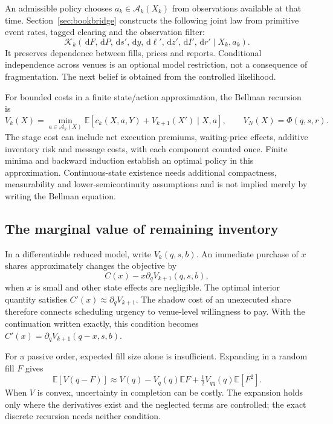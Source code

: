 \documentclass[11pt]{article}
\numberwithin{equation}{section}
\theoremstyle{definition}
\theoremstyle{remark}
\newcommand{\E}{\mathbb{E}}
\theoremstyle{definition}
\newcommand{\A}{\mathcal A}
\newcommand{\K}{\mathcal K}
\newcommand{\dd}{\,\mathrm d}
\begin{document}
An admissible policy chooses $a_k\in\A_k(X_k)$ from observations available at
that time. Section~\ref{sec:bookbridge} constructs the following joint law
from primitive event rates, tagged clearing and the observation filter:
\begin{equation}
 \K_k(\dd F,\dd P,\dd s',\dd y,\dd\ell',\dd z',\dd I',\dd r'
          \mid X_k,a_k).
\end{equation}
It preserves dependence between fills, prices and reports. Conditional
independence across venues is an optional model restriction, not a consequence
of fragmentation. The next belief is obtained from the controlled likelihood.

For bounded costs in a finite state/action approximation, the Bellman recursion is
\begin{equation}\label{eq:bellman}
 V_k(X)=\min_{a\in\A_k(X)}
       \E\left[c_k(X,a,Y)+V_{k+1}(X')\mid X,a\right],
 \qquad V_N(X)=\Phi(q,s,r).
\end{equation}
The stage cost can include net execution premiums, waiting-price effects,
additive inventory risk and message costs, with each component counted once.
Finite minima and backward induction establish an optimal policy in this
approximation. Continuous-state existence needs additional compactness,
measurability and lower-semicontinuity assumptions and is not implied merely
by writing the Bellman equation.

\subsection{The marginal value of remaining inventory}

In a differentiable reduced model, write $V_k(q,s,b)$. An immediate purchase of
$x$ shares approximately changes the objective by
\begin{equation}\label{eq:shadow}
 C(x)-x\partial_qV_{k+1}(q,s,b),
\end{equation}
when $x$ is small and other state effects are negligible. The optimal interior
quantity satisfies $C'(x)\approx\partial_qV_{k+1}$. The shadow cost of an
unexecuted share therefore connects scheduling urgency to venue-level
willingness to pay. With the continuation written exactly, this condition
becomes $C'(x)=\partial_qV_{k+1}(q-x,s,b)$.

For a passive order, expected fill size alone is insufficient. Expanding in a
random fill $F$ gives
\begin{equation}\label{eq:taylor}
\E[V(q-F)]\approx V(q)-V_q(q)\E F+\tfrac12V_{qq}(q)\E[F^2].
\end{equation}
When $V$ is convex, uncertainty in completion can be costly. The expansion
holds only where the derivatives exist and the neglected terms are controlled;
the exact discrete recursion needs neither condition.
\end{document}
